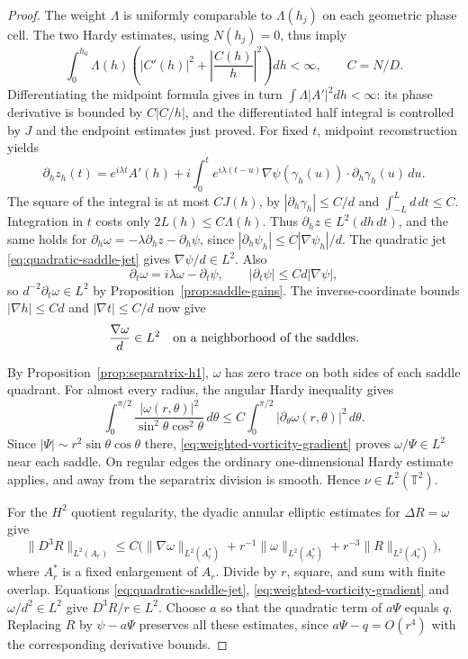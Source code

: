 \documentclass[reqno,11pt]{amsart}
\numberwithin{equation}{section}
\theoremstyle{remark}
\begin{document}
\begin{proof}
The weight $\Lambda$ is uniformly comparable to $\Lambda(h_j)$
on each geometric phase cell.  The two Hardy estimates, using
$N(h_j)=0$, thus imply
\[
 \int_0^{h_0}\Lambda(h)
       \left(|C'(h)|^2+\left|\frac{C(h)}h\right|^2\right)dh<\infty,
 \qquad C=N/D.
\]
Differentiating the midpoint formula gives in turn
$\int\Lambda|A'|^2dh<\infty$: its phase derivative is bounded
by $C|C/h|$, and the differentiated half integral is controlled
by $J$ and the endpoint estimates just proved.  For fixed $t$,
midpoint reconstruction yields
\[
 \partial_h z_h(t)=e^{i\lambda t}A'(h)
 +i\int_0^t e^{i\lambda(t-u)}
       \nabla\psi(\gamma_h(u))\cdot\partial_h\gamma_h(u)\,du.
\]
The square of the integral is at most $CJ(h)$, by
$|\partial_h\gamma_h|\leq C/d$ and $\int_{-L}^Ld\,dt\leq C$.
Integration in $t$ costs only $2L(h)\leq C\Lambda(h)$.
Thus $\partial_hz\in L^2(dh\,dt)$, and the same holds for
$\partial_h\omega=-\lambda\partial_hz-\partial_h\psi$,
since $|\partial_h\psi_h|\leq C|\nabla\psi_h|/d$.
The quadratic jet \eqref{eq:quadratic-saddle-jet} gives
$\nabla\psi/d\in L^2$.
Also
\[
 \partial_t\omega=i\lambda\omega-\partial_t\psi,
 \qquad |\partial_t\psi|\leq Cd|\nabla\psi|,
\]
so $d^{-2}\partial_t\omega\in L^2$ by
Proposition~\ref{prop:saddle-gains}.  The inverse-coordinate
bounds $|\nabla h|\leq Cd$ and $|\nabla t|\leq C/d$ now give
\begin{equation}
 \frac{\nabla\omega}{d}\in L^2
 \quad\hbox{on a neighborhood of the saddles}.
 \label{eq:weighted-vorticity-gradient}
\end{equation}

By Proposition~\ref{prop:separatrix-h1}, $\omega$ has zero trace
on both sides of each saddle quadrant.  For almost every radius,
the angular Hardy inequality gives
\[
 \int_0^{\pi/2}
 \frac{|\omega(r,\theta)|^2}{\sin^2\theta\cos^2\theta}\,d\theta
 \leq C\int_0^{\pi/2}|\partial_\theta\omega(r,\theta)|^2\,d\theta.
\]
Since $|\Psi|\sim r^2\sin\theta\cos\theta$ there,
\eqref{eq:weighted-vorticity-gradient} proves
$\omega/\Psi\in L^2$ near each saddle.  On regular edges the
ordinary one-dimensional Hardy estimate applies, and away from
the separatrix division is smooth.  Hence $\nu\in L^2(\mathbb T^2)$.

For the $H^2$ quotient regularity, the dyadic annular elliptic
estimates for $\Delta R=\omega$ give
\[
 \|D^3R\|_{L^2(A_r)}
 \leq C\big(\|\nabla\omega\|_{L^2(A_r^*)}
 +r^{-1}\|\omega\|_{L^2(A_r^*)}
 +r^{-3}\|R\|_{L^2(A_r^*)}\big),
\]
where $A_r^*$ is a fixed enlargement of $A_r$.
Divide by $r$, square, and sum with finite overlap.  Equations
\eqref{eq:quadratic-saddle-jet},
\eqref{eq:weighted-vorticity-gradient} and $\omega/d^2\in L^2$
give $D^3R/r\in L^2$.
Choose $a$ so that the quadratic term of $a\Psi$ equals $q$.
Replacing $R$ by $\psi-a\Psi$ preserves all these estimates,
since $a\Psi-q=O(r^4)$ with the corresponding derivative bounds.


\end{proof}
\end{document}
